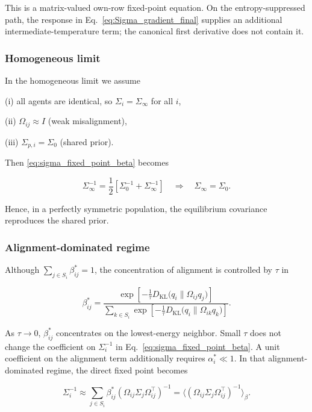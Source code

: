\documentclass[twoside,11pt]{article}
\begin{document}
This is a matrix-valued own-row fixed-point equation. On the entropy-suppressed path, the response in Eq.~\eqref{eq:Sigma_gradient_final} supplies an additional intermediate-temperature term; the canonical first derivative does not contain it.

\subsubsection{Homogeneous limit}

In the homogeneous limit we assume

(i) all agents are identical, so $\Sigma_i = \Sigma_\infty$ for all $i$,

(ii) $\Omega_{ij} \approx I$ (weak misalignment),

(iii) $\Sigma_{p,i} = \Sigma_0$ (shared prior).

Then \eqref{eq:sigma_fixed_point_beta} becomes

\begin{equation}
\Sigma_\infty^{-1}
=\frac{1}{2}
\left[
\Sigma_0^{-1}
+ \Sigma_\infty^{-1}
\right]
\quad\Longrightarrow\quad
\Sigma_\infty = \Sigma_0.
\end{equation}

Hence, in a perfectly symmetric population, the equilibrium covariance reproduces the shared prior.

\subsubsection{Alignment-dominated regime}

Although $\sum_{j\in S_i}\beta_{ij}^*=1$, the concentration of alignment is controlled by $\tau$ in

\begin{equation}
\beta_{ij}^*
=\frac{
\exp \left[
-\frac{1}{\tau}
D_{\mathrm{KL}} \big(q_i \| \Omega_{ij} q_j\big)
\right]
}{\sum_{k\in S_i}
\exp \left[
-\frac{1}{\tau}
D_{\mathrm{KL}} \big(q_i \| \Omega_{ik} q_k\big)
\right]}.
\end{equation}

As $\tau\to0$, $\beta_{ij}^*$ concentrates on the lowest-energy neighbor. Small $\tau$ does not change the coefficient on $\Sigma_i^{-1}$ in Eq.~\eqref{eq:sigma_fixed_point_beta}. A unit coefficient on the alignment term additionally requires $\alpha_i^*\ll1$. In that alignment-dominated regime, the direct fixed point becomes

\begin{equation}
\boxed{
\Sigma_i^{-1}
 \approx 
\sum_{j\in S_i} \beta_{ij}^*
(\Omega_{ij}\Sigma_j\Omega_{ij}^\top)^{-1}
 = \big\langle(\Omega_{ij}\Sigma_j\Omega_{ij}^\top)^{-1}
\big\rangle_{\beta}.}
\label{eq:beta_weighted_precision}
\end{equation}
\end{document}
